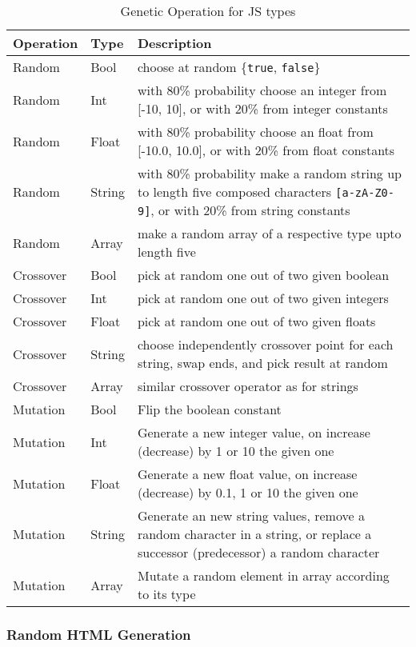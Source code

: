 \documentclass[sigconf]{acmart}
\begin{document}
\begin{table}
  \caption{Genetic Operation for JS types}
  \label{tbl.gen.oper.js.types}
    \footnotesize
  \begin{tabular}{p{1cm}|p{5mm}|p{6cm}}
    \toprule
    \textbf{Operation} & \textbf{Type} & \textbf{Description} \\
    \midrule
    Random & Bool & choose at random \{\texttt{true}, \texttt{false}\} \\
    Random & Int  & with 80\% probability choose an integer from [-10, 10], or with 20\% from integer constants\\
    Random & Float & with 80\% probability choose an float from [-10.0, 10.0], or with 20\% from float constants\\
    Random & String & with 80\% probability make a random string up to length five composed characters \texttt{[a-zA-Z0-9]}, or with 20\% from string constants\\
    Random & Array & make a random array of a respective type upto length five\\
    \midrule
    Crossover & Bool   & pick at random one out of two given boolean \\
    Crossover & Int    & pick at random one out of two given integers\\
    Crossover & Float  & pick at random one out of two given floats\\
    Crossover & String & choose independently crossover point for each string, swap ends, and pick result at random\\
    Crossover & Array & similar crossover operator as for strings\\
    \midrule
    Mutation & Bool & Flip the boolean constant\\
    Mutation & Int  & Generate a new integer value, on increase (decrease) by 1 or 10 the given one\\
    Mutation & Float  & Generate a new float value, on increase (decrease) by 0.1, 1 or 10 the given one\\
    Mutation & String & Generate an new string values, remove a random character in a string, or replace a successor (predecessor) a random character\\
    Mutation & Array & Mutate a random element in array according to its type\\
    \bottomrule
  \end{tabular}
\end{table}

\subsubsection{Random HTML Generation}
\label{sub.sub.sec.random.html}
\end{document}
